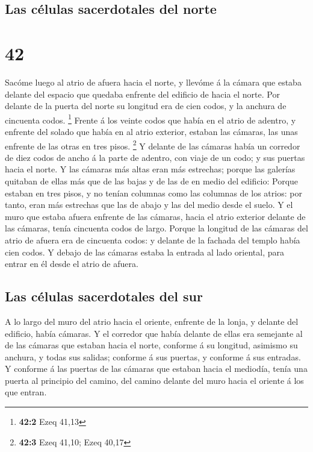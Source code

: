 \hypertarget{las-cuxe9lulas-sacerdotales-del-norte}{%
\subsection{Las células sacerdotales del
norte}\label{las-cuxe9lulas-sacerdotales-del-norte}}

\hypertarget{section-41}{%
\section{42}\label{section-41}}

 Sacóme luego al atrio de afuera hacia el norte, y llevóme
á la cámara que estaba delante del espacio que quedaba enfrente del
edificio de hacia el norte.  Por delante de la puerta del
norte su longitud era de cien codos, y la anchura de cincuenta codos.
\footnote{\textbf{42:2} Ezeq 41,13}  Frente á los veinte
codos que había en el atrio de adentro, y enfrente del solado que había
en al atrio exterior, estaban las cámaras, las unas enfrente de las
otras en tres pisos. \footnote{\textbf{42:3} Ezeq 41,10; Ezeq 40,17}
 Y delante de las cámaras había un corredor de diez codos
de ancho á la parte de adentro, con viaje de un codo; y sus puertas
hacia el norte.  Y las cámaras más altas eran más
estrechas; porque las galerías quitaban de ellas más que de las bajas y
de las de en medio del edificio:  Porque estaban en tres
pisos, y no tenían columnas como las columnas de los atrios: por tanto,
eran más estrechas que las de abajo y las del medio desde el suelo.
 Y el muro que estaba afuera enfrente de las cámaras,
hacia el atrio exterior delante de las cámaras, tenía cincuenta codos de
largo.  Porque la longitud de las cámaras del atrio de
afuera era de cincuenta codos: y delante de la fachada del templo había
cien codos.  Y debajo de las cámaras estaba la entrada al
lado oriental, para entrar en él desde el atrio de afuera.

\hypertarget{las-cuxe9lulas-sacerdotales-del-sur}{%
\subsection{Las células sacerdotales del
sur}\label{las-cuxe9lulas-sacerdotales-del-sur}}

 A lo largo del muro del atrio hacia el oriente, enfrente
de la lonja, y delante del edificio, había cámaras.  Y el
corredor que había delante de ellas era semejante al de las cámaras que
estaban hacia el norte, conforme á su longitud, asimismo su anchura, y
todas sus salidas; conforme á sus puertas, y conforme á sus entradas.
 Y conforme á las puertas de las cámaras que estaban
hacia el mediodía, tenía una puerta al principio del camino, del camino
delante del muro hacia el oriente á los que entran.


